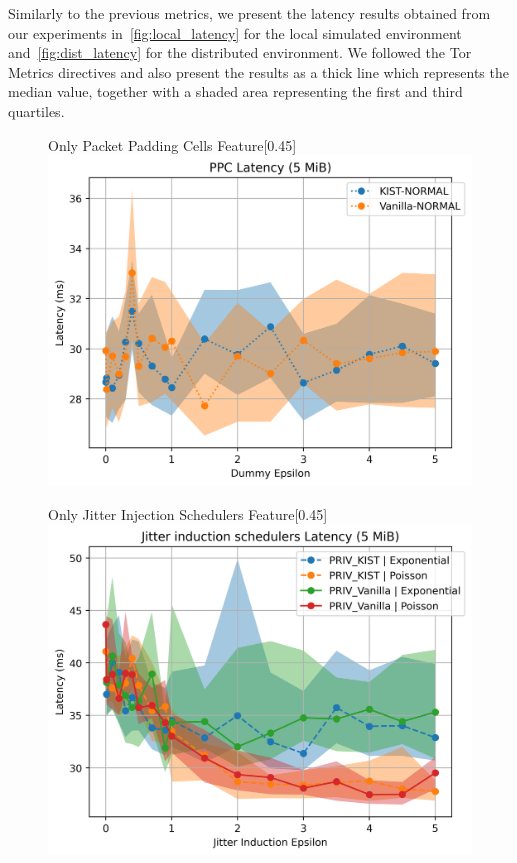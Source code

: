 Similarly to the previous metrics, we present the latency results obtained from our experiments in~\autoref{fig:local_latency} for the local simulated environment and~\autoref{fig:dist_latency} for the distributed environment. We followed the Tor Metrics directives and also present the results as a thick line which represents the median value, together with a shaded area representing the first and third quartiles.

\begin{figure}[htbp]
    \centering
    \begin{subcaptionbox}{Only Packet Padding Cells Feature\label{fig:local_ppc_latency}}[0.45\textwidth]
        {\includegraphics[width=\linewidth]{Chapters/Figures/Plots/local_latency_50_PPC_5mib.png}}
    \end{subcaptionbox}
    \hfill
    \begin{subcaptionbox}{Only Jitter Injection Schedulers Feature\label{fig:local_jitter_latency}}[0.45\textwidth]
        {\includegraphics[width=\linewidth]{Chapters/Figures/Plots/local_latency_50_jitter_5mib.png}}

\end{subcaptionbox}
\end{figure}
